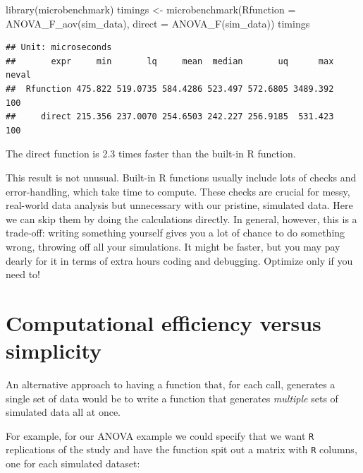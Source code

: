 \documentclass[
]{book}
\newenvironment{Shaded}{\begin{snugshade}}{\end{snugshade}}
\newcommand{\AttributeTok}[1]{\textcolor[rgb]{0.77,0.63,0.00}{#1}}
\newcommand{\FunctionTok}[1]{\textcolor[rgb]{0.00,0.00,0.00}{#1}}
\newcommand{\NormalTok}[1]{#1}
\newcommand{\OtherTok}[1]{\textcolor[rgb]{0.56,0.35,0.01}{#1}}
\begin{document}
\begin{Shaded}
\begin{Highlighting}[]
\FunctionTok{library}\NormalTok{(microbenchmark)}
\NormalTok{timings }\OtherTok{\textless{}{-}} \FunctionTok{microbenchmark}\NormalTok{(}\AttributeTok{Rfunction =} \FunctionTok{ANOVA\_F\_aov}\NormalTok{(sim\_data),}
                          \AttributeTok{direct    =} \FunctionTok{ANOVA\_F}\NormalTok{(sim\_data))}
\NormalTok{timings}
\end{Highlighting}
\end{Shaded}

\begin{verbatim}
## Unit: microseconds
##       expr     min       lq     mean  median       uq      max neval
##  Rfunction 475.822 519.0735 584.4286 523.497 572.6805 3489.392   100
##     direct 215.356 237.0070 254.6503 242.227 256.9185  531.423   100
\end{verbatim}

The direct function is 2.3 times faster than the built-in R function.

This result is not unusual.
Built-in R functions usually include lots of checks and error-handling, which take time to compute. These checks are crucial for messy, real-world data analysis but unnecessary with our pristine, simulated data.
Here we can skip them by doing the calculations directly.
In general, however, this is a trade-off: writing something yourself gives you a lot of chance to do something wrong, throwing off all your simulations. It might be faster, but you may pay dearly for it in terms of extra hours coding and debugging.
Optimize only if you need to!

\hypertarget{sec_comp_efficiency}{%
\section{Computational efficiency versus simplicity}\label{sec_comp_efficiency}}

An alternative approach to having a function that, for each call, generates a single set of data would be to write a function that generates \emph{multiple} sets of simulated data all at once.

For example, for our ANOVA example we could specify that we want \texttt{R} replications of the study and have the function spit out a matrix with \texttt{R} columns, one for each simulated dataset:
\end{document}
